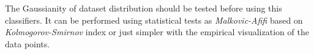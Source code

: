 \documentclass{standalone}
\begin{document}
\begin{itemize}
\end{itemize}

The Gaussianity of dataset distribution should be tested before using this classifiers.
It can be performed using statistical tests as \emph{Malkovic-Afifi} based on \emph{Kolmogorov-Smirnov} index or just simpler with the empirical visualization of the data points.
\end{document}
